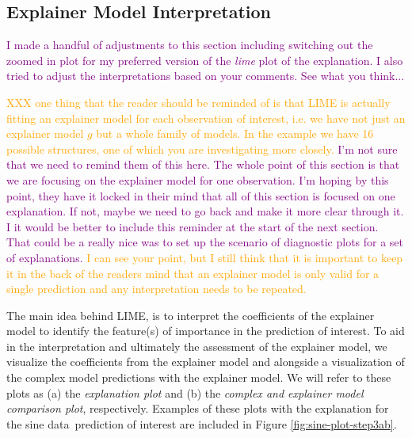 \documentclass[AMS,STIX2COL]{WileyNJD-v2}\usepackage[]{graphicx}\usepackage[]{color}
\newcommand{\hh}[1]{\textcolor{orange}{#1}}
\newcommand{\kgc}[1]{\textcolor{purple}{#1}}
\newcommand{\data}{sine data}
\begin{document}
{\subsection{Explainer Model Interpretation} \label{step3}

\kgc{I made a handful of adjustments to this section including switching out the zoomed in plot for my preferred version of the \emph{lime} plot of the explanation. I also tried to adjust the interpretations based on your comments. See what you think...}

\hh{XXX one thing that the reader should be reminded of is that LIME is actually fitting an explainer model for each observation of interest, i.e. we have not just an explainer model $g$ but a whole family of models. In the example we have 16 possible structures, one of which you are investigating more closely.} \kgc{I'm not sure that we need to remind them of this here. The whole point of this section is that we are focusing on the explainer model for one observation. I'm hoping by this point, they have it locked in their mind that all of this section is focused on one explanation. If not, maybe we need to go back and make it more clear through it. I it would be better to include this reminder at the start of the next section. That could be a really nice was to set up the scenario of diagnostic plots for a set of explanations.} 
\hh{I can see your point, but I still think that it is important to keep it in the back of the readers mind that an explainer model is only valid for a single prediction and any interpretation needs to be repeated. }

The main idea behind LIME, is to interpret the coefficients of the explainer model  to identify the feature(s) of importance in the prediction of interest. To aid in the interpretation and ultimately the assessment of the explainer model, we visualize the coefficients from the explainer model and alongside a visualization of the complex model predictions with the explainer model. We will refer to these plots as (a) the \emph{explanation plot} and (b) the \emph{complex and explainer model comparison plot}, respectively. Examples of these plots with the explanation for the \data \ prediction of interest are included in Figure \ref{fig:sine-plot-step3ab}.

}
\end{document}
